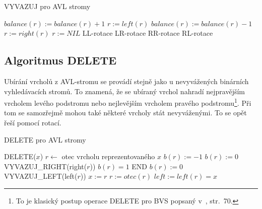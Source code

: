 \begin{algorithm}[!htb]
\caption{VYVAZUJ pro AVL stromy}
\label{alg:avl.bal}
\begin{algorithmic}
\STATE {}
        \STATE $balance(r) := balance(r) + 1$
        \STATE $r:=left(r)$
  \ENDIF
        \STATE $balance(r) := balance(r) - 1$
        \STATE $r := right(r)$
  \ELSE
        \STATE $r := NIL$
  \ENDIF
\ENDWHILE
{}
        \STATE LL-rotace
  \ELSE
        \STATE LR-rotace
  \ENDIF
\ENDIF
{}
        \STATE RR-rotace
  \ELSE
        \STATE RL-rotace
  \ENDIF
\ENDIF
\end{algorithmic}
\end{algorithm}



\subsection{Algoritmus DELETE}

Ubírání vrcholů z AVL-stromu se provádí stejně jako u nevyvážených
binárních vyhledávacích stromů. To znamená, že se ubíraný vrchol nahradí
nejpravějším vrcholem levého podstromu nebo nejlevějším vrcholem pravého
podstromu\footnote{To je klasický postup operace DELETE pro BVS popsaný
v~\cite{Topfer}, str.~70.}. 
Při tom se samozřejmě mohou také některé vrcholy stát
nevyváženými. To se opět řeší pomocí rotací.

\begin{algorithm}[!htb]
\caption{DELETE pro AVL stromy}
\label{alg:avl.del}
\begin{algorithmic}
\STATE DELETE($x$)
\STATE $r \leftarrow$ otec vrcholu reprezentovaného $x$
\STATE {}
\STATE {}
		\STATE {}
                \STATE $b(r) := -1$
        \ENDIF
		\STATE {}
                \STATE $b(r) := 0$
	\STATE {}
        \ELSE                            
                \STATE VYVAZUJ\_RIGHT(right($r$))
        \ENDIF
  \ELSE
		\STATE {}
                \STATE $b(r)=1$                  
                \STATE END
	\ENDIF
		\STATE {}
                \STATE $b(r):=0$
		\STATE {}
        \ELSE
		\STATE VYVAZUJ\_LEFT(left($r$))
        \ENDIF
  \ENDIF
\STATE $x:=r$
\STATE $r:=otec(r)$
\STATE $left:=left(r)=x$
\ENDWHILE
\end{algorithmic}
\end{algorithm}

